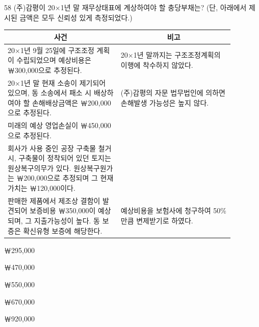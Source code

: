 \begin{question}{58}
(주)감평이 20×1년 말 재무상태표에 계상하여야 할 충당부채는? (단, 아래에서 제시된 금액은 모두 신뢰성 있게 측정되었다.)

{\small\centering\begin{tabular}{|p{0.44\linewidth}|p{0.44\linewidth}|}\hline
\multicolumn{1}{|c|}{사건} & \multicolumn{1}{c|}{비고} \\ \hline
20×1년 9월 25일에 구조조정 계획이 수립되었으며 예상비용은 ￦300,000으로 추정된다. & 20×1년 말까지는 구조조정계획의 이행에 착수하지 않았다. \\ \hline
20×1년 말 현재 소송이 제기되어 있으며, 동 소송에서 패소 시 배상하여야 할 손해배상금액은 ￦200,000으로 추정된다. & (주)감평의 자문 법무법인에 의하면 손해발생 가능성은 높지 않다. \\ \hline
미래의 예상 영업손실이 ￦450,000으로 추정된다. & \\ \hline
회사가 사용 중인 공장 구축물 철거 시, 구축물이 정착되어 있던 토지는 원상복구의무가 있다. 원상복구원가는 ￦200,000으로 추정되며 그 현재가치는 ￦120,000이다. & \\ \hline
판매한 제품에서 제조상 결함이 발견되어 보증비용 ￦350,000이 예상되며, 그 지출가능성이 높다. 동 보증은 확신유형 보증에 해당한다. & 예상비용을 보험사에 청구하여 50\% 만큼 변제받기로 하였다. \\ \hline
\end{tabular}\par}
\vspace{4pt}
\begin{choices}
  \item ￦295,000
  \item ￦470,000
  \item ￦550,000
  \item ￦670,000
  \item ￦920,000
\end{choices}
\end{question}
